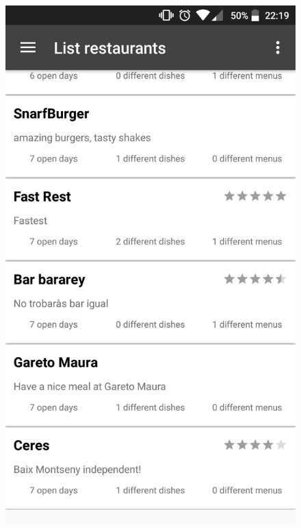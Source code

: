 \begin{figure}[!h]
\centering
\includegraphics[scale=0.15]{Figures/wisebite_screenshot_1.png}

\end{figure}
